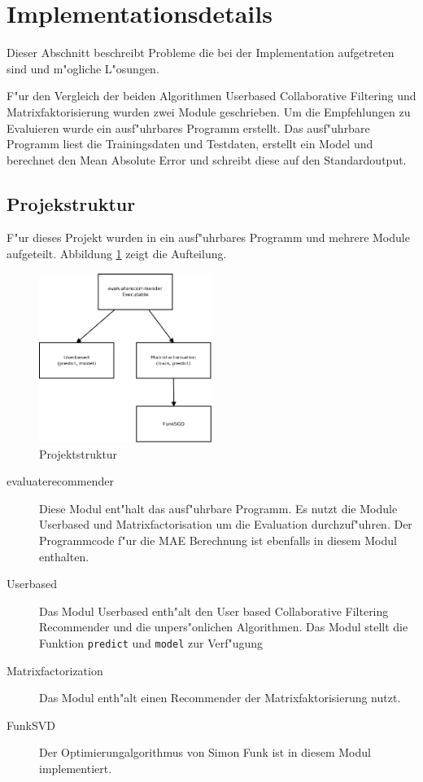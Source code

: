 \documentclass[a4paper, 12pt]{article}
\begin{document}
\section{Implementationsdetails}
\label{sec:ram}

Dieser Abschnitt beschreibt Probleme die bei der Implementation aufgetreten sind und m"ogliche L"osungen.

F"ur den Vergleich der beiden Algorithmen Userbased Collaborative Filtering und Matrixfaktorisierung wurden zwei Module geschrieben. Um die Empfehlungen zu Evaluieren wurde ein ausf"uhrbares Programm erstellt. Das ausf"uhrbare Programm liest die Trainingsdaten und Testdaten, erstellt ein Model und berechnet den Mean Absolute Error und schreibt diese auf den Standardoutput.

\subsection{Projekstruktur}
\label{sec:structur}

F"ur dieses Projekt wurden in ein ausf"uhrbares Programm und mehrere Module aufgeteilt. Abbildung \ref{fig:structur} zeigt die Aufteilung.

\begin{figure}
  \centering
      \includegraphics[width=0.5\textwidth]{structur}
  \caption{Projektstruktur}
  \label{fig:structur}
\end{figure}

\begin{description}
\item[evaluaterecommender] Diese Modul ent"halt das ausf"uhrbare Programm. Es nutzt die Module Userbased und Matrixfactorisation um die Evaluation durchzuf"uhren. Der Programmcode f"ur die MAE Berechnung ist ebenfalls in diesem Modul enthalten.
\item[Userbased] Das Modul Userbased enth"alt den User based Collaborative Filtering Recommender und die unpers"onlichen Algorithmen. Das Modul stellt die Funktion \verb|predict| und \verb|model| zur Verf"ugung
\item[Matrixfactorization] Das Modul enth"alt einen Recommender der Matrixfaktorisierung nutzt.
\item[FunkSVD] Der Optimierungalgorithmus von Simon Funk ist in diesem Modul implementiert.
\end{description}
\end{document}
